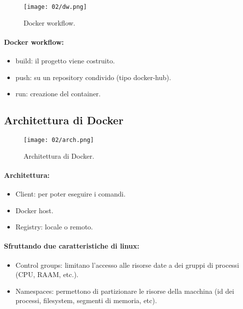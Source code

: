 \begin{figure}[h]
	\centering
	\texttt{[image: 02/dw.png]}
	\caption{Docker workflow.}
\end{figure}

\paragraph{Docker workflow:}

\begin{itemize}
	\item build: il progetto viene costruito.
	\item push: su un repository condivido (tipo docker-hub).
	\item run: creazione del container.
\end{itemize}

\subsection{Architettura di Docker}

\begin{figure}[h]
	\centering
	\texttt{[image: 02/arch.png]}
	\caption{Architettura di Docker.}
\end{figure}

\paragraph{Architettura:}

\begin{itemize}
	\item Client: per poter eseguire i comandi.
	\item Docker host.
	\item Registry: locale o remoto.
\end{itemize}


\paragraph{Sfruttando due caratteristiche di linux:}

\begin{itemize}
	\item Control groups: limitano l'accesso alle risorse date a dei gruppi di processi (CPU, RAAM, etc.).
	\item Namespaces: permettono di partizionare le risorse della macchina (id dei processi, filesystem, segmenti di memoria, etc).
\end{itemize}

